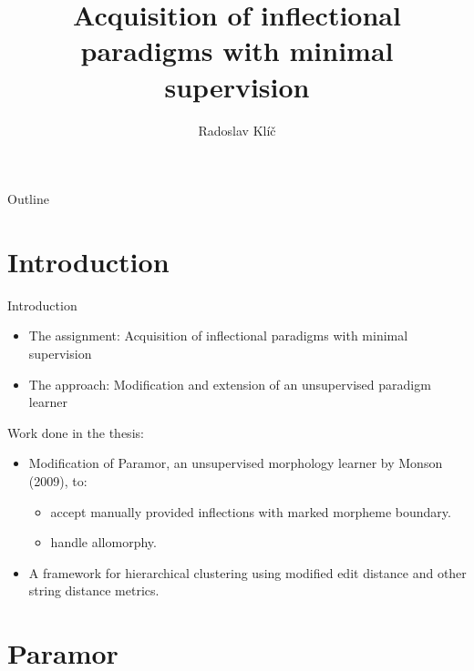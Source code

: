 \documentclass[hyperref={pdfencoding=unicode, unicode=true}]{beamer}
\title[Acquisition of inflectional paradigms]{Acquisition of inflectional paradigms with minimal supervision}
\author{Radoslav Klíč}
\institute{MFF UK}
\date{}
\begin{document}

\begin{frame}
\titlepage
\end{frame}

\begin{frame}{Outline}
	\tableofcontents
\end{frame}

\section{Introduction}

\begin{frame}{Introduction}

\begin{itemize}
\item The assignment: Acquisition of inflectional paradigms with minimal supervision
\item The approach: Modification and extension of an unsupervised paradigm learner
\end{itemize}

\end{frame}

\begin{frame}{}

Work done in the thesis:
\begin{itemize}
\item Modification of Paramor, an unsupervised morphology learner by Monson (2009),  to: \begin{itemize}
    \item accept manually provided inflections with marked morpheme boundary.
    \item handle allomorphy.
\end{itemize}
\item A framework for hierarchical clustering using modified edit distance and other string distance metrics.
\end{itemize}

\end{frame}

\section{Paramor}
\end{document}
